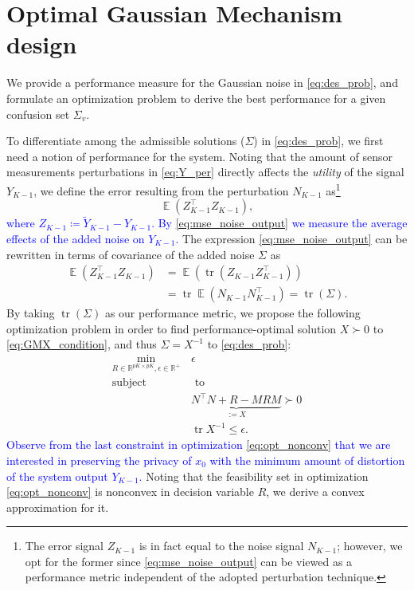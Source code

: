 \documentclass{ifacconf}
\DeclareMathOperator{\tr}{tr}
\newcommand{\R}{\ensuremath{\mathbb R}}
\DeclareMathOperator{\E}{\mathbb{E}}
\def\be{\begin{equation}}
\def\ee{\end{equation}}
\newcommand{\+}{\mathsmaller{+}}
\newcommand{\blue}[1]{\textcolor{blue}{#1}}
\begin{document}
\section{Optimal Gaussian Mechanism design}\label{sec:Analytical solution}
We provide a performance measure for the Gaussian noise in \eqref{eq:des_prob}, and formulate an optimization problem to derive the best performance for a given confusion set $\Sigma_v$. 
%
\par To differentiate among the admissible solutions ($\Sigma$) in \eqref{eq:des_prob}, we first need a notion of performance for the system. Noting that the amount of sensor measurements perturbations in \eqref{eq:Y_per} directly affects the {\em utility} of the signal $Y_{K-1}$, %
%
%
we define the error resulting from the perturbation $N_{K-1}$ as\footnote{The error signal $Z_{K-1}$ is in fact equal to the noise signal $N_{K-1}$; however, we opt for the former since \eqref{eq:mse_noise_output} can be viewed as a performance metric independent of the adopted perturbation technique.}
\be\label{eq:mse_noise_output}
\E(Z_{K-1} ^\top Z_{K-1}),
\ee
\blue{where $Z_{K-1} \coloneqq \tilde{Y}_{K-1} - {Y}_{K-1}$. By \eqref{eq:mse_noise_output} we measure the average effects of the added noise on $Y_{K-1}$.} The expression \eqref{eq:mse_noise_output} can be rewritten in terms of covariance of the added noise $\Sigma$ as 
\be\label{eq:mse_out_proof}
\begin{aligned}
	\E(Z_{K-1} ^\top Z_{K-1}) &= \E (\tr(Z_{K-1} Z_{K-1} ^\top)) \\ & =   \tr \E (N_{K-1} N_{K-1} ^\top)  = \tr(\Sigma) .
\end{aligned}
\ee
By taking $\tr(\Sigma)$ as our performance metric, we 
propose the following optimization problem in order to find performance-optimal solution $X\succ 0$ to \eqref{eq:GMX_condition}, and thus $\Sigma= X^{-1}$ to \eqref{eq:des_prob}:
%
%
\be\label{eq:opt_nonconv}
\begin{aligned}
	\min_{R \in \R^{pK \times pK}, \epsilon \in \R^{+}}  \,& \epsilon  \\
	\text{sub}\text{ject}& \,\, \text{to}  \\
	&\underbrace{ N^{\top}N + R - MRM}_{:=X} \succ  0 \\
	&\tr X^{-1} \leq \epsilon  .
\end{aligned}
\ee
\blue{Observe from the last constraint in optimization \eqref{eq:opt_nonconv} that we are interested in preserving the privacy of $x_0$ with the minimum amount of distortion of the system output $Y_{K-1}$.}
Noting that the feasibility set in optimization \eqref{eq:opt_nonconv} is  nonconvex in decision variable $R$, we derive a convex approximation for it.
\end{document}
